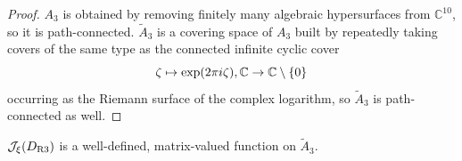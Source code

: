\documentclass{sl2ams}
\numberwithin{equation}{section}
\newcommand{\CC}{\mathbb{C}}
\newcommand{\J}{\mathcal{J}}
\begin{document}
\begin{proof}
  \(A_3\) is obtained by removing finitely many algebraic hypersurfaces from \(\CC^{10}\), so it is path-connected.
  \(\widetilde{A}_{3}\) is a covering space of \(A_{3}\) built by repeatedly taking covers of the same type as the connected infinite cyclic cover
  \[
    \zeta \mapsto \exp(2\pi i \zeta) , \CC \to \CC \setminus \set{0}
  \]
  occurring as the Riemann surface of the complex logarithm, so \(\widetilde{A}_3\) is path-connected as well.
\end{proof}

\begin{lemma}
  \label{thm:DR3-well-defined}
  \(\J_{\xi}(D_{\RIII})\) is a well-defined, matrix-valued function on \(\widetilde{A}_{3}\).
\end{lemma}
\end{document}
